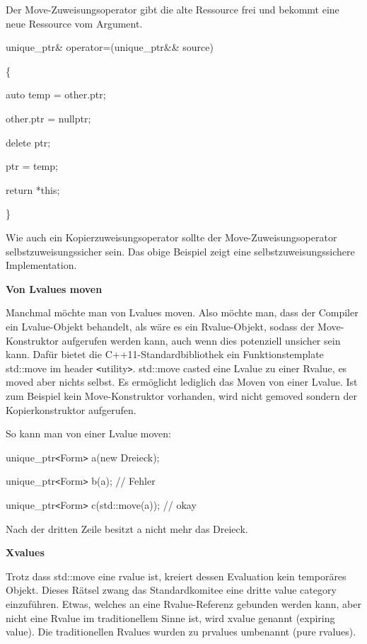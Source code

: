 \documentclass{article}
\begin{document}
Der Move-Zuweisungsoperator gibt die alte Ressource frei und bekommt eine neue 
Ressource vom Argument.

unique\_ptr\& operator=(unique\_ptr\&\& source)

\{    

\parindent=14pt
auto temp = other.ptr;    

other.ptr = nullptr;    

\parindent=28pt
delete ptr;    

\parindent=14pt
ptr = temp;    

\vspace{12pt}
return *this;

\}

\parindent=0pt
Wie auch ein Kopierzuweisungsoperator sollte der Move-Zuweisungsoperator selbstzuweisungssicher 
sein. Das obige Beispiel zeigt eine selbstzuweisungssichere Implementation.

\vspace{25pt}
\textbf{Von Lvalues moven}

Manchmal möchte man von Lvalues moven. Also möchte man, dass der Compiler ein 
Lvalue-Objekt behandelt, als wäre es ein Rvalue-Objekt, sodass der Move-Konstruktor 
aufgerufen werden kann, auch wenn dies potenziell unsicher sein kann. Dafür bietet 
die C++11-Standardbibliothek ein Funktionstemplate std::move im header \texttt{<}utility\texttt{>}. 
std::move casted eine Lvalue zu einer Rvalue, es moved aber nichts selbst. Es ermöglicht 
lediglich das Moven von einer Lvalue. Ist zum Beispiel kein Move-Konstruktor vorhanden, 
wird nicht gemoved sondern der Kopierkonstruktor aufgerufen.

So kann man von einer Lvalue moven:

unique\_ptr\texttt{<}Form\texttt{>} a(new Dreieck);

unique\_ptr\texttt{<}Form\texttt{>} b(a);            // Fehler

unique\_ptr\texttt{<}Form\texttt{>} c(std::move(a)); // okay

\vspace{12pt}
Nach der dritten Zeile besitzt a nicht mehr das Dreieck.

\vspace{12pt}
\textbf{Xvalues}

Trotz dass std::move eine rvalue ist, kreiert dessen Evaluation kein temporäres 
Objekt. Dieses Rätsel zwang das Standardkomitee eine dritte value category einzuführen. 
Etwas, welches an eine Rvalue-Referenz gebunden werden kann, aber nicht eine Rvalue 
im traditionellem Sinne ist, wird xvalue genannt (expiring value). Die traditionellen 
Rvalues wurden zu prvalues umbenannt (pure rvalues).
\end{document}
